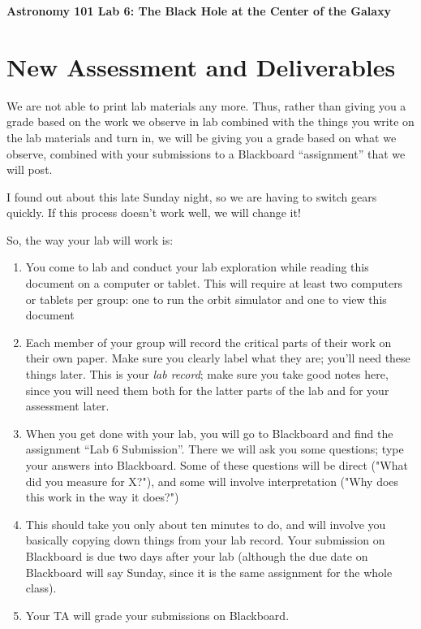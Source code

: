 \documentclass[11pt]{article}
\begin{document}
\begin{center}
\textbf{\Large
\vspace*{0.1cm}
Astronomy 101 Lab 6: The Black Hole at the Center of the Galaxy
}
\end{center}



\section{New Assessment and Deliverables}

We are not able to print lab materials any more. Thus, rather than giving you a grade based on the work we observe in lab combined with the things you write on the lab materials and turn in, we will be giving you a grade based on what we observe, combined with your submissions to a Blackboard ``assignment'' that we will post.

I found out about this late Sunday night, so we are having to switch gears quickly. If this process doesn't work well, we will change it!

So, the way your lab will work is:

\begin{enumerate}
	\item You come to lab and conduct your lab exploration while reading this document on a computer or tablet. This will require at least two computers or tablets per group: one to run the orbit simulator and one to view this document
	\item Each member of your group will record the critical parts of their work on their own paper. Make sure you clearly label what they are; you'll need these things later. This is your {\it lab record}; make sure you take good notes here, since you will need them both for the latter parts of the lab and for your assessment later.
	\item When you get done with your lab, you will go to Blackboard and find the assignment ``Lab 6 Submission''. There we will ask you some questions; type your answers into Blackboard. Some of these questions will be direct ("What did you measure for X?"), and some will involve interpretation ("Why does this work in the way it does?")
	\item This should take you only about ten minutes to do, and will involve you basically copying down things from your lab record. Your submission on Blackboard is due two days after your lab (although the due date on Blackboard will say Sunday, since it is the same assignment for the whole class).
	\item Your TA will grade your submissions on Blackboard.
\end{enumerate}
\end{document}
